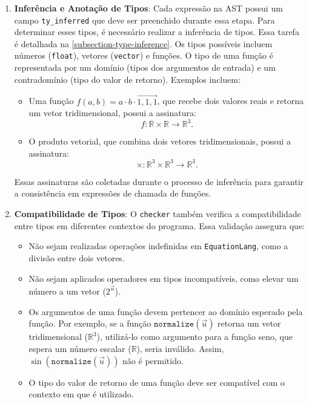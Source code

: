 \begin{enumerate}
    \item \textbf{Inferência e Anotação de Tipos}:
    Cada expressão na AST possui um campo \verb"ty_inferred" que deve ser preenchido durante essa etapa. Para determinar esses tipos, é necessário realizar a inferência de tipos. Essa tarefa é detalhada na \autoref{subsection-type-inference}. Os tipos possíveis incluem números (\verb"float"), vetores (\verb"vector") e funções.
        O tipo de uma função é representada por um domínio (tipos dos argumentos de entrada) e um contradomínio (tipo do valor de retorno). Exemplos incluem:
        \begin{itemize}
            \item Uma função $f(a, b) = a \cdot b \cdot \vec{1,1,1}$, que recebe dois valores reais e retorna um vetor tridimensional, possui a assinatura:
            \[
            f : \mathbb{R} \times \mathbb{R} \to \mathbb{R}^3.
            \]
            \item O produto vetorial, que combina dois vetores tridimensionais, possui a assinatura:
            \[
            \times : \mathbb{R}^3 \times \mathbb{R}^3 \to \mathbb{R}^3.
            \]
        \end{itemize}
        Essas assinaturas são coletadas durante o processo de inferência para garantir a consistência em expressões de chamada de funções.

    \item \textbf{Compatibilidade de Tipos}:
    O \texttt{checker} também verifica a compatibilidade entre tipos em diferentes contextos do programa. Essa validação assegura que:
    \begin{itemize}
        \item Não sejam realizadas operações indefinidas em \texttt{EquationLang}, como a divisão entre dois vetores.
        \item Não sejam aplicados operadores em tipos incompatíveis, como elevar um número a um vetor ($2^{\vec{n}}$).
        \item Os argumentos de uma função devem pertencer ao domínio esperado pela função. Por exemplo, se a função $\texttt{normalize}(\vec{u})$ retorna um vetor tridimensional ($\mathbb{R}^3$), utilizá-lo como argumento para a função seno, que espera um número escalar ($\mathbb{R}$), seria inválido. Assim, $\sin(\texttt{normalize}(\vec{u}))$ não é permitido.
        \item O tipo do valor de retorno de uma função deve ser compatível com o contexto em que é utilizado.
    \end{itemize}


\end{enumerate}
